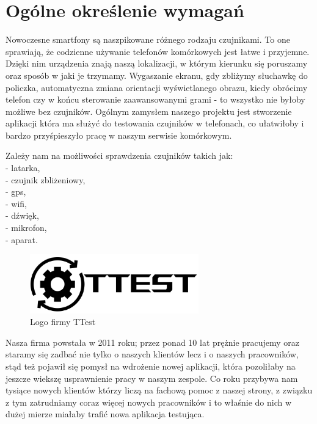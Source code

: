 \section{Ogólne określenie wymagań}		%

\hspace{0.60cm}Nowoczesne smartfony są naszpikowane różnego rodzaju czujnikami. To one sprawiają, że codzienne używanie telefonów komórkowych jest łatwe i przyjemne. Dzięki nim urządzenia znają naszą lokalizacji, w którym kierunku się poruszamy oraz sposób w jaki je trzymamy. Wygaszanie ekranu, gdy zbliżymy słuchawkę do policzka, automatyczna zmiana orientacji wyświetlanego obrazu, kiedy obrócimy telefon czy
w końcu sterowanie zaawansowanymi grami - to wszystko nie byłoby możliwe bez czujników. Ogólnym zamysłem naszego projektu jest stworzenie aplikacji która ma służyć do testowania czujników w telefonach, co ułatwiłoby i bardzo przyśpieszyło pracę w naszym serwisie komórkowym. \newline 

Zależy nam na możliwości sprawdzenia czujników takich jak: \\
- latarka, \\
- czujnik zbliżeniowy, \\
- gps, \\
- wifi, \\
- dźwięk, \\
- mikrofon, \\
- aparat.\\

\begin{figure}[!hbt]
	\begin{center}
		\includegraphics[angle=360, width=0.65\textwidth]{rys/punkt1/logo_black.png}
		\caption{Logo firmy TTest}
		\label{rys:logo}
	\end{center}
\end{figure}

Nasza firma powstała w 2011 roku; przez ponad 10 lat prężnie pracujemy oraz staramy się zadbać nie tylko o naszych klientów lecz i o naszych pracowników, stąd też pojawił się pomysł na wdrożenie nowej aplikacji, która pozoliłaby na jeszcze wiekszę usprawnienie pracy w naszym zespole. Co roku przybywa nam tysiące nowych klientów którzy liczą na fachową pomoc z naszej strony, z związku z tym zatrudniamy coraz więcej nowych pracowników i to właśnie do nich w dużej mierze miałaby trafić nowa aplikacja testująca. 

